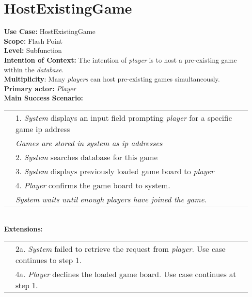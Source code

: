 \documentclass{article}
\begin{document}
	\section*{HostExistingGame}
	\textbf{Use Case:} HostExistingGame\\
	\textbf{Scope:} Flash Point\\
	\textbf{Level:} Subfunction\\
	\textbf{Intention of Context:} The intention of \textit{player} is to host a pre-existing game within the \textit{database}.\\
	\textbf{Multiplicity}: Many \textit{players} can host pre-existing games simultaneously.\\
	\textbf{Primary actor:} \textit{Player}\\
	\textbf{Main Success Scenario:}\\
	\begin{tabular}{l l}
		&1. \textit{System} displays an input field prompting \textit{player} for a specific game ip address\\
		&\qquad\textit{Games are stored in system as ip addresses}\\
		&2. \textit{System} searches database for this game\\
		&3. \textit{System} displays previously loaded game board to \textit{player}\\
		&4. \textit{Player} confirms the game board to system.\\
		&\qquad\textit{System waits until enough players have joined the game.}
	\end{tabular}\\
	\textbf{Extensions:}\\
	\begin{tabular}{l l}
		&2a. \textit{System} failed to retrieve the request from \textit{player}. Use case continues to step 1.\\
		&4a. \textit{Player} declines the loaded game board. Use case continues at step 1.
	\end{tabular}
\end{document}
